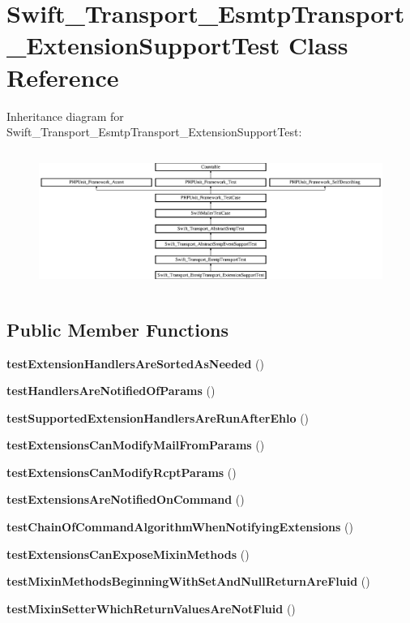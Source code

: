 \section{Swift\+\_\+\+Transport\+\_\+\+Esmtp\+Transport\+\_\+\+Extension\+Support\+Test Class Reference}
\label{class_swift___transport___esmtp_transport___extension_support_test}
Inheritance diagram for Swift\+\_\+\+Transport\+\_\+\+Esmtp\+Transport\+\_\+\+Extension\+Support\+Test\+:\begin{figure}[H]
\begin{center}
\leavevmode
\includegraphics[height=4.525252cm]{class_swift___transport___esmtp_transport___extension_support_test}
\end{center}
\end{figure}
\subsection*{Public Member Functions}
\begin{DoxyCompactItemize}
\item 
{\bf test\+Extension\+Handlers\+Are\+Sorted\+As\+Needed} ()
\item 
{\bf test\+Handlers\+Are\+Notified\+Of\+Params} ()
\item 
{\bf test\+Supported\+Extension\+Handlers\+Are\+Run\+After\+Ehlo} ()
\item 
{\bf test\+Extensions\+Can\+Modify\+Mail\+From\+Params} ()
\item 
{\bf test\+Extensions\+Can\+Modify\+Rcpt\+Params} ()
\item 
{\bf test\+Extensions\+Are\+Notified\+On\+Command} ()
\item 
{\bf test\+Chain\+Of\+Command\+Algorithm\+When\+Notifying\+Extensions} ()
\item 
{\bf test\+Extensions\+Can\+Expose\+Mixin\+Methods} ()
\item 
{\bf test\+Mixin\+Methods\+Beginning\+With\+Set\+And\+Null\+Return\+Are\+Fluid} ()
\item 
{\bf test\+Mixin\+Setter\+Which\+Return\+Values\+Are\+Not\+Fluid} ()
\end{DoxyCompactItemize}
